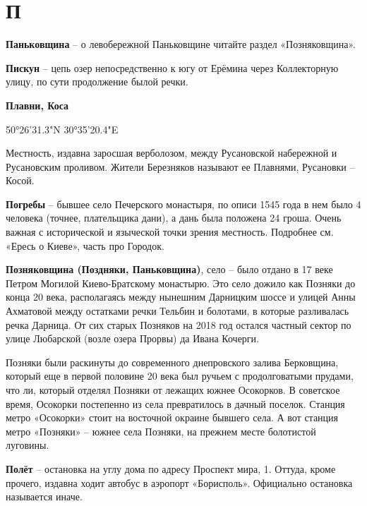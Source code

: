 \chapter*{П}

\textbf{Паньковщина} – о левобережной Паньковщине читайте раздел «Позняковщина».\\

\medskip


\textbf{Пискун} – цепь озер непосредственно к югу от Ерёмина через Коллекторную улицу, по сути продолжение былой речки.\\

\medskip


\textbf{Плавни, Коса}

50°26'31.3"N 30°35'20.4"E

Местность, издавна заросшая верболозом, между Русановской набережной и Русановским проливом. Жители Березняков называют ее Плавнями, Русановки – Косой.\\

\medskip


\textbf{Погребы} – бывшее село Печерского монастыря, по описи 1545 года в нем было 4 человека (точнее, плательщика дани), а дань была положена 24 гроша. Очень важная с исторической и языческой точки зрения местность. Подробнее см. «Ересь о Киеве», часть про Городок.\\

\medskip

\textbf{Позняковщина (Поздняки, Паньковщина)}, село – было отдано в 17 веке Петром Могилой Киево-Братскому монастырю. Это село дожило как Позняки до конца 20 века, располагаясь между нынешним Дарницким шоссе и улицей Анны Ахматовой между остатками речки Тельбин и болотами, в которые разливалась речка Дарница. От сих старых Позняков на 2018 год остался частный сектор по улице Любарской (возле озера Прорвы) да Ивана Кочерги.

Позняки были раскинуты до современного днепровского залива Берковщина, который еще в первой половине 20 века был ручьем с продолговатыми прудами, что ли, который отделял Позняки от лежащих южнее Осокорков. В советское время, Осокорки постепенно из села превратилось в дачный поселок. Станция метро «Осокорки» стоит на восточной окраине бывшего села. А вот станция метро «Позняки» – южнее села Позняки, на прежнем месте болотистой луговины.\\

\medskip


\textbf{Полёт} – остановка на углу дома по адресу Проспект мира, 1. Оттуда, кроме прочего, издавна ходит автобус в аэропорт «Борисполь». Официально остановка называется иначе.\\ 

